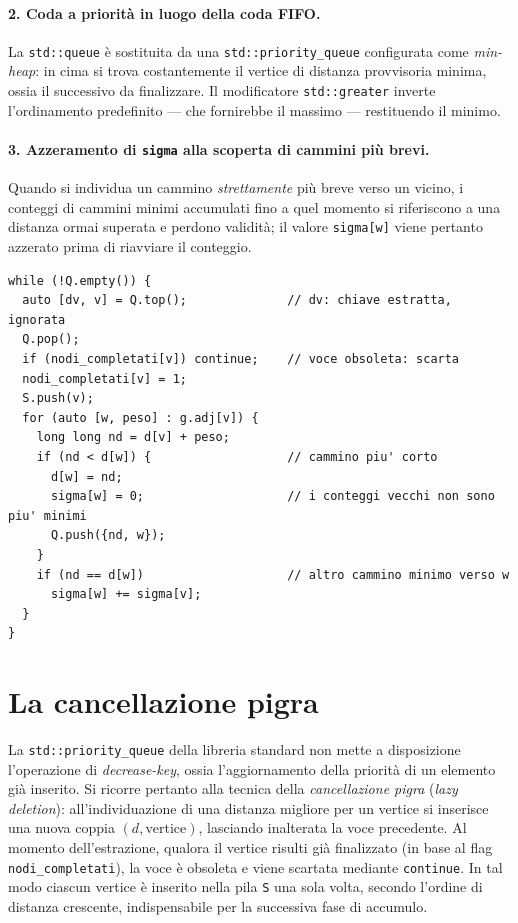 \documentclass[11pt,a4paper]{report}
\begin{document}
\paragraph{2. Coda a priorità in luogo della coda FIFO.} La \texttt{std::queue} è
sostituita da una \texttt{std::priority\_queue} configurata come \emph{min-heap}:
in cima si trova costantemente il vertice di distanza provvisoria minima, ossia il
successivo da finalizzare. Il modificatore \texttt{std::greater} inverte
l'ordinamento predefinito --- che fornirebbe il massimo --- restituendo il minimo.

\paragraph{3. Azzeramento di \texttt{sigma} alla scoperta di cammini più brevi.}
Quando si individua un cammino \emph{strettamente} più breve verso un vicino, i
conteggi di cammini minimi accumulati fino a quel momento si riferiscono a una
distanza ormai superata e perdono validità; il valore \texttt{sigma[w]} viene
pertanto azzerato prima di riavviare il conteggio.

\begin{lstlisting}[caption={Fase 1 pesata: Dijkstra con conteggio dei cammini
minimi.}]
while (!Q.empty()) {
  auto [dv, v] = Q.top();              // dv: chiave estratta, ignorata
  Q.pop();
  if (nodi_completati[v]) continue;    // voce obsoleta: scarta
  nodi_completati[v] = 1;
  S.push(v);
  for (auto [w, peso] : g.adj[v]) {
    long long nd = d[v] + peso;
    if (nd < d[w]) {                   // cammino piu' corto
      d[w] = nd;
      sigma[w] = 0;                    // i conteggi vecchi non sono piu' minimi
      Q.push({nd, w});
    }
    if (nd == d[w])                    // altro cammino minimo verso w
      sigma[w] += sigma[v];
  }
}
\end{lstlisting}

\section{La cancellazione pigra}

La \texttt{std::priority\_queue} della libreria standard non mette a disposizione
l'operazione di \emph{decrease-key}, ossia l'aggiornamento della priorità di un
elemento già inserito. Si ricorre pertanto alla tecnica della \emph{cancellazione
	pigra} (\emph{lazy deletion}): all'individuazione di una distanza migliore per un
vertice si inserisce una nuova coppia $(d,\text{vertice})$, lasciando inalterata
la voce precedente. Al momento dell'estrazione, qualora il vertice risulti già
finalizzato (in base al flag \texttt{nodi\_completati}), la voce è obsoleta e viene scartata
mediante \texttt{continue}. In tal modo ciascun vertice è inserito nella pila
\texttt{S} una sola volta, secondo l'ordine di distanza crescente,
indispensabile per la successiva fase di accumulo.
\end{document}
